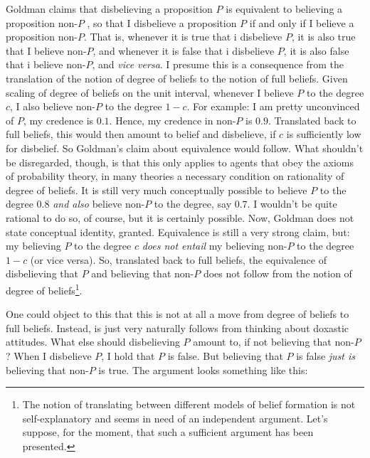 \documentclass[12pt,numbers=noenddot]{scrartcl}
\begin{document}
Goldman claims that disbelieving a proposition $P$ is equivalent to believing a proposition non-$P$ \textcite[58]{Goldman2002-GOLTUO-2}, so that I disbelieve a proposition $P$ if and only if I believe a proposition non-$P$. That is, whenever it is true that i disbelieve $P$, it is also true that I believe non-$P$, and whenever it is false that i disbelieve $P$, it is also false that i believe non-$P$, and \emph{vice versa}. I presume this is a consequence from the translation of the notion of degree of beliefs to the notion of full beliefs. Given scaling of degree of beliefs on the unit interval, whenever I believe $P$ to the degree $c$, I also believe non-$P$ to the degree $1-c$. For example: I am pretty unconvinced of $P$, my credence is $0.1$. Hence, my credence in non-$P$ is $0.9$. Translated back to full beliefs, this would then amount to belief and disbelieve, if $c$ is sufficiently low for disbelief. So Goldman's claim about equivalence would follow. What shouldn't be disregarded, though, is that this only applies to agents that obey the axioms of probability theory, in many theories a necessary condition on rationality of degree of beliefs. It is still very much conceptually possible to believe $P$ to the degree $0.8$ \emph{and also} believe non-$P$ to the degree, say $0.7$. I wouldn't be quite rational to do so, of course, but it is certainly possible. Now, Goldman does not state conceptual identity, granted. Equivalence is still a very strong claim, but: my believing $P$ to the degree $c$ \emph{does not entail} my believing non-$P$ to the degree $1-c$ (or vice versa). So, translated back to full beliefs, the equivalence of disbelieving that $P$ and believing that non-$P$ does not follow from the notion of degree of beliefs\footnote{The notion of translating between different models of belief formation is not self-explanatory and seems in need of an independent argument. Let's suppose, for the moment, that such a sufficient argument has been presented.}.

One could object to this that this is not at all a move from degree of beliefs to full beliefs. Instead, is just very naturally follows from thinking about doxastic attitudes. What else should disbelieving $P$ amount to, if not believing that non-$P$? When I disbelieve $P$, I hold that $P$ is false. But believing that $P$ is false \emph{just is} believing that non-$P$ is true. The argument looks something like this:
\end{document}
